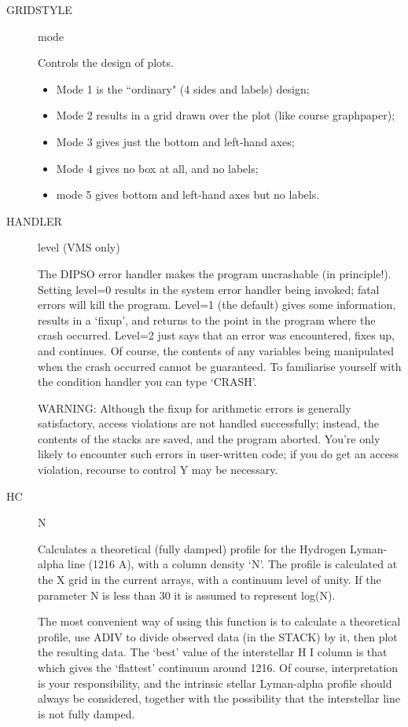 \begin {description}
\item [GRIDSTYLE] mode

Controls the design of plots.

\begin{itemize}
\item Mode 1 is the ``ordinary" (4 sides and labels) design;
\item Mode 2 results in a grid drawn over the plot (like course graphpaper);
\item Mode 3 gives just the bottom and left-hand axes;
\item Mode 4 gives no box at all, and no labels;
\item mode 5 gives bottom and left-hand axes but no labels.
\end{itemize}

\item [HANDLER] level  (VMS only)

The DIPSO error handler makes the program uncrashable (in principle!).
Setting level=0 results in the system error handler being invoked;
fatal errors will kill the program. Level=1 (the default) gives some
information, results in a `fixup', and returns to the point in the
program where the crash occurred. Level=2 just says that an error was
encountered, fixes up, and continues. Of course, the contents of any
variables being manipulated when the crash occurred cannot be
guaranteed. To familiarise yourself with the condition handler you can
type `CRASH'.

WARNING: Although the fixup for arithmetic errors is generally
satisfactory, access violations are not handled successfully; 
instead, the contents of the stacks are saved, and the program
aborted. You're only likely to encounter such errors in user-written
code; if you do get an access violation, recourse to control Y may be
necessary.

\item [HC] N

Calculates a theoretical (fully damped) profile for the Hydrogen
Lyman-alpha line (1216 A), with a column density `N'. The profile is
calculated at the X grid in the current arrays, with a continuum level
of unity.   If the parameter N is less than 30 it is assumed to
represent log(N).

The most convenient way of using this function is to calculate a
theoretical profile, use ADIV to divide observed data (in the STACK)
by it, then plot the resulting data. The `best' value of the
interstellar H I column is that which gives the `flattest' continuum
around 1216. Of course, interpretation is your responsibility, and the
intrinsic stellar Lyman-alpha profile should always be considered,
together with the possibility that the interstellar line is not fully
damped.


\end{description}
